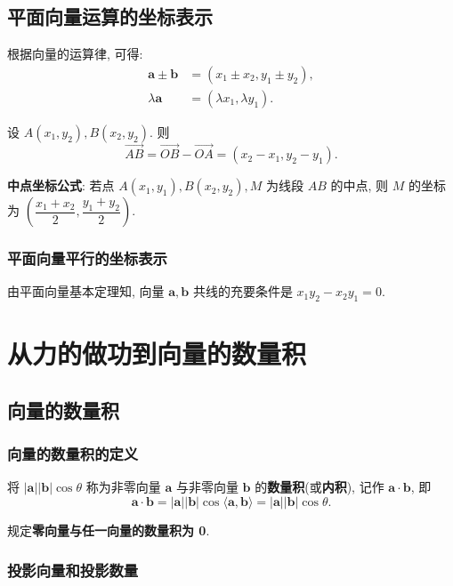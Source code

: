 \documentclass[titlepage]{ctexart}
\begin{document}
\subsection{平面向量运算的坐标表示}

根据向量的运算律, 可得:
\begin{align*}
    \boldsymbol{a} \pm \boldsymbol{b} &= (x_1 \pm x_2, y_1 \pm y_2), \\
    \lambda \boldsymbol{a} &= (\lambda x_1, \lambda y_1).
\end{align*}

设 $A(x_1, y_2), B(x_2, y_2)$. 则
\[
\overrightarrow{AB} = \overrightarrow{OB} - \overrightarrow{OA} = (x_2 - x_1, y_2 - y_1).
\]

\textbf{中点坐标公式}: 若点 $A(x_1, y_1), B(x_2, y_2), M$ 为线段 $AB$ 的中点,
则 $M$ 的坐标为 $\left(\dfrac{x_1 + x_2}{2}, \dfrac{y_1 + y_2}{2}\right)$. 

\subsubsection{平面向量平行的坐标表示}

由平面向量基本定理知, 向量 $\boldsymbol{a}, \boldsymbol{b}$ 共线的充要条件是 $x_1y_2 - x_2y_1 = 0$.


\section{从力的做功到向量的数量积}

\subsection{向量的数量积}

\subsubsection{向量的数量积的定义}
将 $|\boldsymbol{a}||\boldsymbol{b}|\cos \theta$ 称为非零向量 $\boldsymbol{a}$ 与非零向量 $\boldsymbol{b}$ 的\textbf{数量积}(或\textbf{内积}), 
记作 $\boldsymbol{a \cdot \boldsymbol{b}}$, 即
\[
\boldsymbol{a \cdot b} = |\boldsymbol{a}| |\boldsymbol{b}| \cos \langle \boldsymbol{a}, \boldsymbol{b} \rangle 
                       = |\boldsymbol{a}| |\boldsymbol{b}| \cos \theta.
\]

规定\textbf{零向量与任一向量的数量积为 0}.

\subsubsection{投影向量和投影数量}
\end{document}
